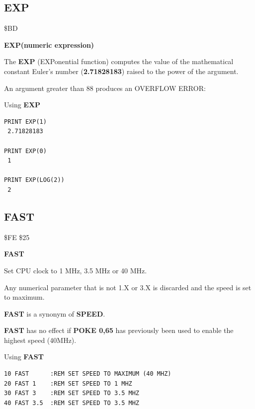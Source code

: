 \subsection{EXP}
\begin{description}[leftmargin=2cm,style=nextline]
\item [Token:] \$BD
\item [Format:] {\bf EXP(numeric expression)}
\item [Usage:] The {\bf EXP} (EXPonential function) computes
               the value of the mathematical constant
               Euler's number ({\bf 2.71828183})
               raised to the power of the
               argument.

\item [Remarks:] An argument greater than 88 produces
                 an OVERFLOW ERROR:
\item [Examples:] Using {\bf EXP}
\begin{tcolorbox}[colback=black,coltext=white]
\verbatimfont{\codefont}
\begin{verbatim}
PRINT EXP(1)
 2.71828183

PRINT EXP(0)
 1

PRINT EXP(LOG(2))
 2
\end{verbatim}
\end{tcolorbox}
\end{description}


\newpage
\subsection{FAST}
\begin{description}[leftmargin=2cm,style=nextline]
\item [Token:] \$FE \$25
\item [Format:] {\bf FAST}
\item [Usage:] Set CPU clock to 1 MHz, 3.5 MHz or 40 MHz.
\item [Remarks:] Any numerical parameter that is not 1.X or 3.X
                 is discarded and the speed is set to maximum.

                 {\bf FAST} is a synonym of {\bf SPEED}.

                 {\bf FAST} has no effect if {\bf POKE 0,65}
                 has previously been used to enable the highest speed (40MHz).

\item [Example:] Using {\bf FAST}
\begin{tcolorbox}[colback=black,coltext=white]
\verbatimfont{\codefont}
\begin{verbatim}
10 FAST      :REM SET SPEED TO MAXIMUM (40 MHZ)
20 FAST 1    :REM SET SPEED TO 1 MHZ
30 FAST 3    :REM SET SPEED TO 3.5 MHZ
40 FAST 3.5  :REM SET SPEED TO 3.5 MHZ
\end{verbatim}
\end{tcolorbox}
\end{description}


